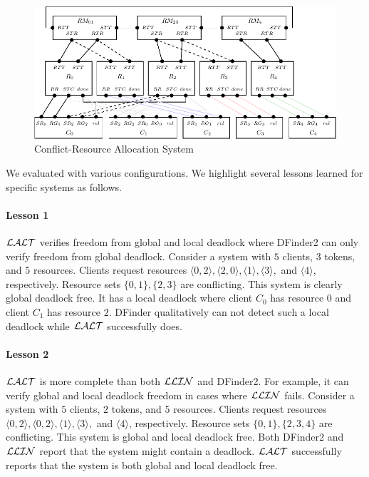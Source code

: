 \begin{figure}[H]
\begin{center}
\includegraphics[scale=0.9]{compiledfigures/resourceallocation-crop.pdf}
\caption{Conflict-Resource Allocation System}
\label{fig:resourceallocation}
\end{center}
\end{figure}

We evaluated \deadlocktool{} with various configurations.
We highlight several lessons learned for specific systems as follows. 

\paragraph{Lesson 1} 
$\mathcal{LALT}$ verifies freedom from global and local deadlock where DFinder2 can only verify freedom from global deadlock.
Consider a system with $5$ clients, $3$ tokens, and $5$ resources.
Clients request resources $\langle 0, 2\rangle, \langle 2, 0\rangle, \langle 1 \rangle, \langle 3\rangle,$ and $\langle 4\rangle$, respectively.
Resource sets $\{ 0, 1\}, \{2,3\}$ are conflicting. 
This system is clearly global deadlock free. 
It has a local deadlock where client $C_0$ has resource $0$ and client $C_1$ has resource $2$. 
DFinder qualitatively can not detect such a local deadlock while $\mathcal{LALT}$ successfully does. 

\paragraph{Lesson 2} 
$\mathcal{LALT}$ is more complete than both $\mathcal{LLIN}$ and DFinder2. For example, it can verify global and local deadlock freedom in cases where $\mathcal{LLIN}$ fails. 
Consider a system with $5$ clients, $2$ tokens, and $5$ resources.
Clients request resources $\langle0, 2\rangle, \langle 0, 2\rangle, \langle 1 \rangle, \langle 3\rangle,$ and $\langle 4\rangle$, respectively.
Resource sets $\{ 0, 1\}, \{2,3,4\}$ are conflicting. 
This system is global and local deadlock free. 
Both DFinder2 and $\mathcal{LLIN}$ report that the system might contain a deadlock. 
$\mathcal{LALT}$ successfully reports that the system is both global and local deadlock free. 

